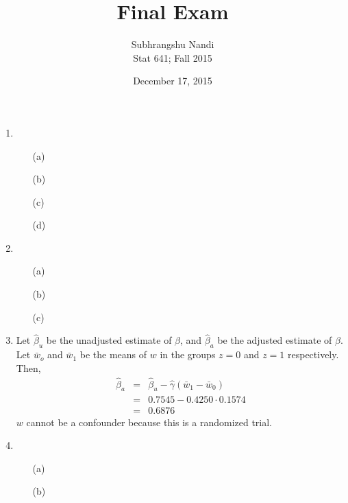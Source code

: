 \documentclass[11pt,a4paper]{article}
\begin{document}
\title{Final Exam}
\author{Subhrangshu Nandi\\
  Stat 641; Fall 2015}
\date{December 17, 2015}

\maketitle

\begin{enumerate}
\item 
\begin{enumerate}
\item[(a)] 
\item[(b)] 
\item[(c)] 
\item[(d)] 
\end{enumerate}

\item
\begin{enumerate}
\item[(a)] 
\item[(b)] 
\item[(c)] 
\end{enumerate}

\item
Let $\hat{\beta}_u$ be the unadjusted estimate of $\beta$, and $\hat{\beta}_a$ be the adjusted estimate of $\beta$. Let $\bar{w}_o$ and $\bar{w}_1$ be the means of $w$ in the groups $z = 0$ and $z = 1$ respectively. Then,
\begin{eqnarray*}
\hat{\beta}_a & = & \hat{\beta}_u - \hat{\gamma}(\bar{w}_1 - \bar{w}_0) \\
              & = & 0.7545 - 0.4250 \cdot 0.1574 \\
              & = & 0.6876
\end{eqnarray*}
$w$ cannot be a confounder because this is a randomized trial.

\item
\begin{enumerate}
\item[(a)] 
\item[(b)] 
\end{enumerate}


\end{enumerate}
\end{document}
